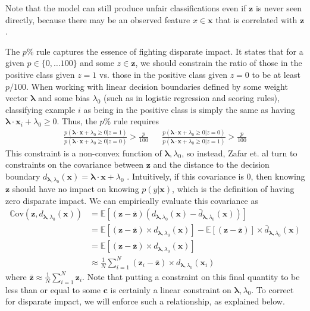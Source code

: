 \documentclass[11pt, margin=1in]{article}
\newcommand{\vect}[1]{\boldsymbol{#1}}
\newcommand{\E}{\mathbb{E}}
\begin{document}
Note that the model can still produce unfair classifications even if $\vect{z}$ is never seen directly, because there may be an observed feature $x \in \vect{x}$ that is correlated with $\vect{z}$.

The $p$\% rule captures the essence of fighting disparate impact.  It states that for a given $p \in \{0, \ldots 100\}$ and some $z \in \vect{z}$, we should constrain the ratio of those in the positive class given $z = 1$ vs. those in the positive class given $z = 0$ to be at least $p / 100$.  When working with linear decision boundaries defined by some weight vector $\vect{\lambda}$ and some bias $\lambda_0$ (such as in logistic regression and scoring rules), classifying example $i$ as being in the positive class is simply the same as having $\vect{\lambda} \cdot \vect{x}_i + \lambda_0 \geq 0$.  Thus, the $p$\% rule requires
\begin{align*}
\frac{p(\vect{\lambda} \cdot \vect{x} + \lambda_0 \geq 0 \vert z = 1)}{p(\vect{\lambda} \cdot \vect{x} + \lambda_0 \geq 0 \vert z = 0)} > \frac{p}{100}  & & \frac{p(\vect{\lambda} \cdot \vect{x} + \lambda_0 \geq 0 \vert z = 0)}{p(\vect{\lambda} \cdot \vect{x} + \lambda_0 \geq 0 \vert z = 1)} > \frac{p}{100}
\end{align*}  
This constraint is a non-convex function of $\vect{\lambda}, \lambda_0$, so instead, Zafar et. al turn to constraints on the covariance between $\vect{z}$ and the distance to the decision boundary $d_{\vect{\lambda}, \lambda_0}(\vect{x}) =  \vect{\lambda} \cdot \vect{x} + \lambda_0$ \cite{disparate-impact}.  Intuitively, if this covariance is 0, then knowing $\vect{z}$ should have no impact on knowing $p(y \vert \vect{x})$, which is the definition of having zero disparate impact.  We can empirically evaluate this covariance as 
\begin{align*}
\mathbb{C}\text{ov}(\vect{z}, d_{\vect{\lambda}, \lambda_0}(\vect{x})) &= \E[(\vect{z} - \vect{\bar{z}})(d_{\vect{\lambda}, \lambda_0}(\vect{x}) - \bar{d}_{\vect{\lambda}, \lambda_0}(\vect{x}))] \\
&= \E[(\vect{z} - \vect{\bar{z}}) \times d_{\vect{\lambda}, \lambda_0}(\vect{x})] - \E[(\vect{z} - \vect{\bar{z}})]  \times \bar{d}_{\vect{\lambda}, \lambda_0}(\vect{x}) \\
&= \E[(\vect{z} - \vect{\bar{z}}) \times d_{\vect{\lambda}, \lambda_0}(\vect{x})] \\
&\approx \frac{1}{N}\sum_{i=1}^N (\vect{z}_i - \vect{\bar{z}}) \times d_{\vect{\lambda}, \lambda_0}(\vect{x}_i)
\end{align*}
where $\vect{\bar{z}} \approx \frac{1}{N} \sum_{i=1}^N \vect{z}_i$.  Note that putting a constraint on this final quantity to be less than or equal to some $\vect{c}$ is certainly a linear constraint on $\vect{\lambda}, \lambda_0$.  To correct for disparate impact, we will enforce such a relationship, as explained below.  
\end{document}
